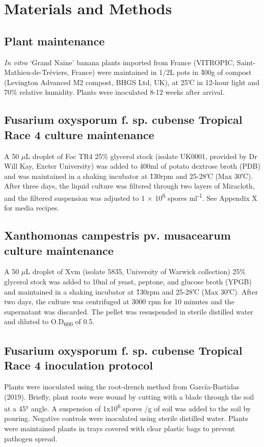 \newpage
\section{Materials and Methods}\label{sec:Chapter4_MM}
\subsection{Plant maintenance }
\textit{In vitro }‘Grand Naine’ banana plants imported from France (VITROPIC, Saint-Mathieu-de-Tréviers, France) were maintained in 1/2L pots in \~400g of compost (Levington Advanced M2 compost, BHGS Ltd, UK), at 25℃ in 12-hour light and 70\% relative humidity. Plants were inoculated 8-12 weeks after arrival. 

\subsection{Fusarium oxysporum f. sp. cubense Tropical Race 4 culture maintenance}
A 50 \(\mu\)L droplet of Foc TR4 25\% glycerol stock (isolate UK0001, provided by Dr Will Kay, Exeter University) was added to 400ml of potato dextrose broth (PDB) and was maintained in a shaking incubator at \~130rpm and 25-28℃ (Max 30℃). After three days, the liquid culture was filtered through two layers of Miracloth, and the filtered suspension was adjusted to 1 × 10\textsuperscript{6} spores ml\textsuperscript{-1}. See Appendix X for media recipes.

\subsection{Xanthomonas campestris pv. musacearum culture maintenance}
A 50 \(\mu\)L droplet of Xvm (isolate 5835, University of Warwick collection) 25\% glycerol stock was added to 10ml of yeast, peptone, and glucose broth (YPGB) and maintained in a shaking incubator at \~130rpm and 25-28℃ (Max 30℃). After two days, the culture was centrifuged at 3000 rpm for 10 minutes and the supernatant was discarded. The pellet was resuspended in sterile distilled water and diluted to O.D\textsubscript{600} of 0.5. 

\subsection{Fusarium oxysporum f. sp. cubense Tropical Race 4 inoculation protocol}
Plants were inoculated using the root-drench method from García-Bastidas \et (2019). Briefly, plant roots were wound by cutting with a blade through the soil at a 45° angle. A suspension of 1x10\textsuperscript{6} spores /g of soil was added to the soil by pouring. Negative controls were inoculated using sterile distilled water. Plants were maintained plants in trays covered with clear plastic bags to prevent pathogen spread. 

